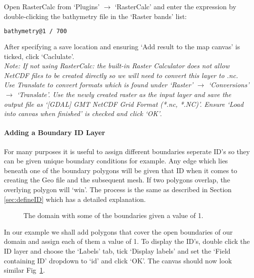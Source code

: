Open RasterCalc from `Plugins' $\rightarrow$ `RasterCalc' and enter the expression by double-clicking the bathymetry file in the `Raster bands' list:

\begin{example}
  \begin{lstlisting}[language=bash]
  bathymetry@1 / 700
\end{lstlisting}
\end{example}

After specifying a save location and ensuring `Add result to the map canvas' is ticked, click `Caclulate'. \\

\emph{Note: If not using RasterCalc: the built-in Raster Calculator does not allow NetCDF files to be created directly so we will need to convert this layer to .nc. Use Translate to convert formats which is found under `Raster' $\rightarrow$ `Conversions' $\rightarrow$ `Translate'. Use the newly created raster as the input layer and save the output file as `[GDAL] GMT NetCDF Grid Format (*.nc, *.NC)'. Ensure `Load into canvas when finished' is checked and click `OK'}.

\paragraph{Adding a Boundary ID Layer\\}
\label{sec:addID}
For many purposes it is useful to assign different boundaries seperate ID's so they can be given unique boundary conditions for example. Any edge which lies beneath one of the boundary polygons will be given that ID when it comes to creating the Geo file and the subsequent mesh. If two polygons overlap, the overlying polygon will `win'. The process is the same as described in Section \ref{sec:defineID} which has a detailed explanation.

\begin{figure}[h!]
  \centering
  \caption{The domain with some of the boundaries given a value of 1.}
  \label{fig:mn_ids}
\end{figure}

In our example we shall add polygons that cover the open boundaries of our domain and assign each of them a value of 1. To display the ID's, double click the ID layer and choose the `Labels' tab, tick `Display labels' and set the `Field containing ID' dropdown to `id' and click `OK'. The canvas should now look similar Fig~\ref{fig:mn_ids}.

